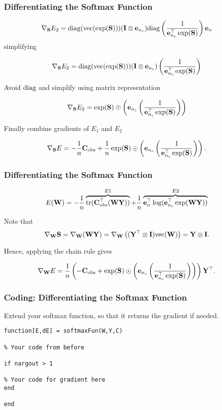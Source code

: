 \documentclass[12pt,fleqn,handout]{beamer}
\begin{document}
\begin{frame}[fragile]\frametitle{Differentiating the Softmax Function}

 
 $$ \nabla_{{\bf S}}E_2 =     {\rm diag}( {\rm vec}(\exp({\bf S}))) ({\bf I} \otimes {\bf e}_{n_c})
  {\rm diag}
\left( {\frac {1}{{\bf e}_{n_c}^\top\exp({\bf S})}}\right) {\bf e}_n
     $$
\pause
simplifying

 $$ \nabla_{{\bf S}}E_2 =     {\rm diag}( {\rm vec}(\exp({\bf S}))) ({\bf I} \otimes {\bf e}_{n_c})
\left( {\frac {1}{{\bf e}_{n_c}^\top\exp({\bf S})}}\right)
     $$
 
\pause    
     Avoid ${\rm diag}$ and simplify using  matrix representation
     
 $$ \nabla_{{\bf S}}E_2 =     \exp({\bf S}) \odot 
\left( {\bf e}_{n_c} \left({\frac {1}{{\bf e}_{n_c}^\top \exp({\bf S})}}\right)\right) 
     $$
     
     \bigskip
     \pause
     Finally combine gradients of $E_1$ and $E_2$
     
$$     \nabla_{{\bf S}}E =  -\frac{1}{n}{\bf C}_{\rm obs} + \frac{1}{n}\exp({\bf S}) \odot 
\left( {\bf e}_{n_c} \left({\frac {1}{{\bf e}_{n_c}^\top \exp({\bf S})}}\right)\right) . $$
     
    

\end{frame}

\begin{frame}[fragile]\frametitle{Differentiating the Softmax Function}

$$ E({\bf W}) = -\frac{1}{n}\overbrace{{\rm tr}({\bf C}_{\rm obs}^{\top} ({\bf W}{\bf Y}))}^{E1} + \frac{1}{n} \overbrace{{\bf e}_n^{\top}\log({\bf e}_{n_c}^\top \exp({\bf W}{\bf Y}))}^{E2}  $$

\bigskip
Note that
$$
	\nabla_{{\bf W}} {\bf S} = \nabla_{{\bf W}} ({\bf W} {\bf Y}) = \nabla_{{\bf W}} \left( ({\bf Y}^\top \otimes {\bf I}) {\rm vec}({\bf W}) \right) = {\bf Y} \otimes {\bf I}. 
$$


\bigskip

Hence, applying the chain rule gives
     
$$     \nabla_{{\bf W}}E = \frac{1}{n} \left( -{\bf C}_{\rm obs} + \exp({\bf S}) \odot 
\left( {\bf e}_{n_c} \left({\frac {1}{{\bf e}_{n_c}^\top \exp({\bf S})}}\right)\right) \right){\bf Y}^\top. $$
     

\end{frame}


\begin{frame}[fragile]\frametitle{Coding: Differentiating the Softmax Function}

Extend your softmax function, so that it returns the gradient if needed.

\begin{verbatim}
function[E,dE] = softmaxFun(W,Y,C)

% Your code from before

if nargout > 1

% Your code for gradient here
end

end
\end{verbatim}

\end{frame}
\end{document}
